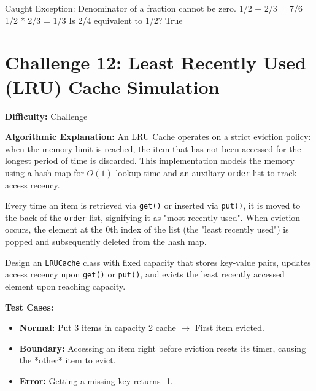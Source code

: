 \begin{outputbox}
Caught Exception: Denominator of a fraction cannot be zero.
1/2 + 2/3 = 7/6
1/2 * 2/3 = 1/3
Is 2/4 equivalent to 1/2? True
\end{outputbox}

\section{Challenge 12: Least Recently Used (LRU) Cache Simulation}

\textbf{Difficulty:} Challenge

\textbf{Algorithmic Explanation:}
An LRU Cache operates on a strict eviction policy: when the memory limit is reached, the item that has not been accessed for the longest period of time is discarded. This implementation models the memory using a hash map for $O(1)$ lookup time and an auxiliary \texttt{order} list to track access recency.

Every time an item is retrieved via \texttt{get()} or inserted via \texttt{put()}, it is moved to the back of the \texttt{order} list, signifying it as "most recently used". When eviction occurs, the element at the 0th index of the list (the "least recently used") is popped and subsequently deleted from the hash map. 

\begin{practiceset}
Design an \texttt{LRUCache} class with fixed capacity that stores key-value pairs, updates access recency upon \texttt{get()} or \texttt{put()}, and evicts the least recently accessed element upon reaching capacity.

\textbf{Test Cases:}
\begin{itemize}
    \item \textbf{Normal:} Put 3 items in capacity 2 cache $\rightarrow$ First item evicted.
    \item \textbf{Boundary:} Accessing an item right before eviction resets its timer, causing the *other* item to evict.
    \item \textbf{Error:} Getting a missing key returns -1.
\end{itemize}
\end{practiceset}

